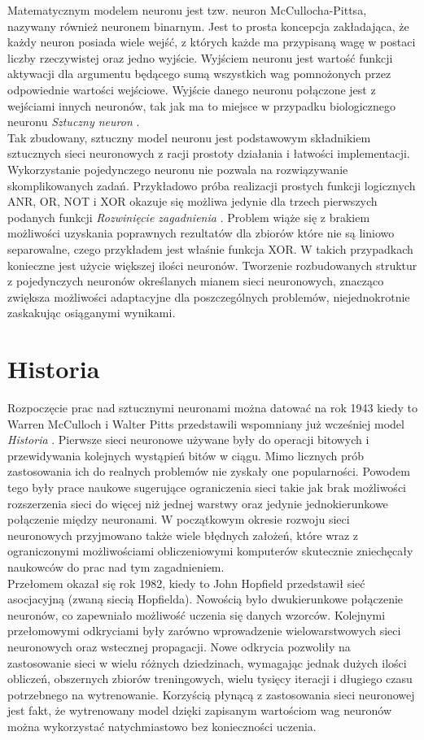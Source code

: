 Matematycznym modelem neuronu jest tzw. neuron McCullocha-Pittsa, nazywany
również neuronem binarnym. Jest to prosta koncepcja zakładająca, że każdy neuron
posiada wiele wejść, z których każde ma przypisaną wagę w postaci liczby
rzeczywistej oraz jedno wyjście. Wyjściem neuronu jest wartość funkcji aktywacji
dla argumentu będącego sumą wszystkich wag pomnożonych przez odpowiednie
wartości wejściowe. Wyjście danego neuronu połączone jest z wejściami innych
neuronów, tak jak ma to miejsce w przypadku biologicznego neuronu \textit{Sztuczny neuron} \cite{CS231n}.\\
Tak zbudowany, sztuczny model neuronu jest podstawowym składnikiem sztucznych sieci
neuronowych z racji prostoty działania i łatwości implementacji.\\
Wykorzystanie pojedynczego neuronu nie pozwala na rozwiązywanie skomplikowanych zadań.
Przykładowo próba realizacji prostych funkcji logicznych ANR, OR, NOT i XOR okazuje
się możliwa jedynie dla trzech pierwszych podanych funkcji \textit{Rozwinięcie zagadnienia} \cite{XORproblem}.
Problem wiąże się z brakiem możliwości uzyskania poprawnych rezultatów dla zbiorów które
nie są liniowo separowalne, czego przykładem jest właśnie funkcja XOR. W takich przypadkach
konieczne jest użycie większej ilości neuronów. Tworzenie rozbudowanych struktur z pojedynczych
neuronów określanych mianem sieci neuronowych, znacząco zwiększa możliwości adaptacyjne
dla poszczególnych problemów, niejednokrotnie zaskakując osiąganymi wynikami.

\section{Historia}

Rozpoczęcie prac nad sztucznymi neuronami można datować na rok 1943 kiedy to
Warren McCulloch i Walter Pitts przedstawili wspomniany już wcześniej model \textit{Historia} \cite{NNbiology}.
Pierwsze sieci neuronowe używane były do operacji bitowych i przewidywania kolejnych
wystąpień bitów w ciągu. Mimo licznych prób zastosowania ich do realnych problemów
nie zyskały one popularności. Powodem tego były prace naukowe sugerujące ograniczenia
sieci takie jak brak możliwości rozszerzenia sieci do więcej niż jednej warstwy oraz
jedynie jednokierunkowe połączenie między neuronami. W początkowym okresie rozwoju
sieci neuronowych przyjmowano także wiele błędnych założeń, które wraz z ograniczonymi
możliwościami obliczeniowymi komputerów skutecznie zniechęcały naukowców do prac
nad tym zagadnieniem.\\
Przełomem okazał się rok 1982, kiedy to John Hopfield przedstawił sieć asocjacyjną
(zwaną siecią Hopfielda). Nowością było dwukierunkowe połączenie neuronów, co
zapewniało możliwość uczenia się danych wzorców. Kolejnymi przełomowymi odkryciami
były zarówno wprowadzenie wielowarstwowych sieci neuronowych oraz wstecznej
propagacji. Nowe odkrycia pozwoliły na zastosowanie sieci w wielu różnych
dziedzinach, wymagając jednak dużych ilości obliczeń, obszernych zbiorów
treningowych, wielu tysięcy iteracji i długiego czasu potrzebnego na wytrenowanie.
Korzyścią płynącą z zastosowania sieci neuronowej jest fakt, że wytrenowany model
dzięki zapisanym wartościom wag neuronów można wykorzystać natychmiastowo bez konieczności
uczenia.
